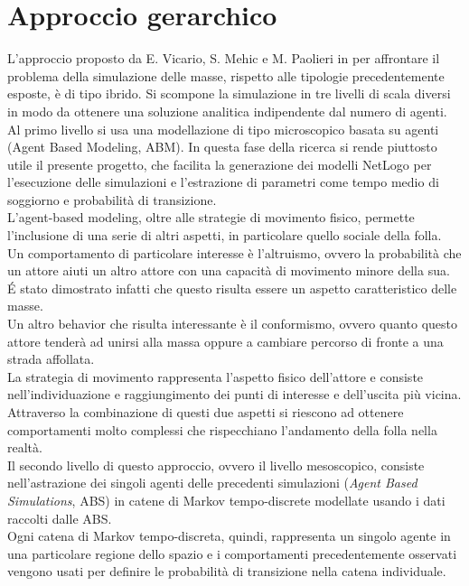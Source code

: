 \section{Approccio gerarchico}
\label{sec:approccio-gerarchico}
L'approccio proposto da E. Vicario, S. Mehic e M. Paolieri  in \cite{hierarchical-report} per affrontare il problema della simulazione delle masse, rispetto alle tipologie precedentemente esposte, è di tipo ibrido. Si scompone la simulazione in tre livelli di scala diversi in modo da ottenere una soluzione analitica indipendente dal numero di agenti.\\
Al primo livello si usa una modellazione di tipo microscopico basata su agenti (Agent Based Modeling, ABM). In questa fase della ricerca si rende piuttosto utile il presente progetto, che facilita la generazione dei modelli NetLogo per l'esecuzione delle simulazioni e l'estrazione di parametri come tempo medio di soggiorno e probabilità di transizione.\\
L'agent-based modeling, oltre alle strategie di movimento fisico, permette l'inclusione di una serie di altri aspetti, in particolare quello sociale della folla.\\
Un comportamento di particolare interesse è l'altruismo, ovvero la probabilità che un attore aiuti un altro attore con una capacità di movimento minore della sua. \'E stato dimostrato infatti che questo risulta essere un aspetto caratteristico delle masse.\\
Un altro behavior che risulta interessante è il conformismo, ovvero quanto questo attore tenderà ad unirsi alla massa oppure a cambiare percorso di fronte a una strada affollata.\\
La strategia di movimento rappresenta l'aspetto fisico dell'attore e consiste nell'individuazione e raggiungimento dei punti di interesse e dell'uscita più vicina.\\
Attraverso la combinazione di questi due aspetti si riescono ad ottenere comportamenti molto complessi che rispecchiano l'andamento della folla nella realtà.\\
Il secondo livello di questo approccio, ovvero il livello mesoscopico, consiste nell'astrazione dei singoli agenti delle precedenti simulazioni (\textit{Agent Based Simulations}, ABS) in catene di Markov tempo-discrete modellate usando i dati raccolti dalle ABS.\\
Ogni catena di Markov tempo-discreta, quindi, rappresenta un singolo agente in una particolare regione dello spazio e i comportamenti precedentemente osservati vengono usati per definire le probabilità di transizione nella catena individuale.\\
